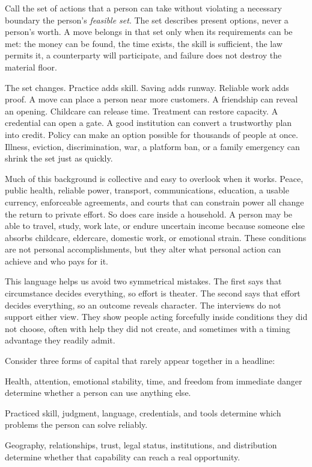 Call the set of actions that a person can take without violating a necessary
boundary the person's \emph{feasible set}. The set describes present options,
never a person's worth. A move belongs in that set only when its
requirements can be met: the money can be found, the time exists, the skill is
sufficient, the law permits it, a counterparty will participate, and failure
does not destroy the material floor.

The set changes. Practice adds skill. Saving adds runway. Reliable work adds
proof. A move can place a person near more customers. A friendship can reveal
an opening. Childcare can release time. Treatment can restore capacity. A
credential can open a gate. A good institution can convert a trustworthy plan
into credit. Policy can make an option possible for thousands of people at
once. Illness, eviction, discrimination, war, a platform ban, or a family
emergency can shrink the set just as quickly.

Much of this background is collective and easy to overlook when it works.
Peace, public health, reliable power, transport, communications, education, a
usable currency, enforceable agreements, and courts that can constrain power
all change the return to private effort. So does care inside a household. A
person may be able to travel, study, work late, or endure uncertain income
because someone else absorbs childcare, eldercare, domestic work, or emotional
strain. These conditions are not personal accomplishments, but they alter what
personal action can achieve and who pays for it.

This language helps us avoid two symmetrical mistakes. The first says that
circumstance decides everything, so effort is theater. The second says that
effort decides everything, so an outcome reveals character. The interviews do
not support either view. They show people acting forcefully inside conditions
they did not choose, often with help they did not create, and sometimes with a
timing advantage they readily admit.

Consider three forms of capital that rarely appear together in a headline:

\begin{description}[leftmargin=2.2em,style=nextline]
\item[Capacity] Health, attention, emotional stability, time, and freedom from
  immediate danger determine whether a person can use anything else.
\item[Capability] Practiced skill, judgment, language, credentials, and tools
  determine which problems the person can solve reliably.
\item[Access] Geography, relationships, trust, legal status, institutions, and
  distribution determine whether that capability can reach a real opportunity.
\end{description}

